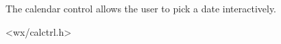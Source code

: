
\section{}\label{wxcalendarctrl}

The calendar control allows the user to pick a date interactively.


<wx/calctrl.h>


